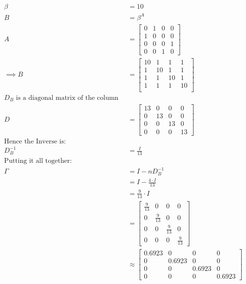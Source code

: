\documentclass[11pt]{article}
\begin{document}
\begin{align}
    \beta &= 10 \\
    B &= \beta^A \\
    A &=
    \begin{bmatrix}
0& 1& 0& 0 \\
1& 0& 0& 0 \\
0& 0& 0& 1 \\
0& 0& 1& 0
    \end{bmatrix} \\
     \implies
    B &= \begin{bmatrix}
     10 & 1 & 1 & 1 \\
     1 & 10 & 1 & 1 \\
     1 & 1 & 10 & 1 \\
     1 & 1 & 1 & 10 \\
     \end{bmatrix}  \\
     \text{$D_B$ is a diagonal matrix of the column sums:}\\
     D &= \begin{bmatrix}
     13 & 0 & 0 & 0 \\
     0 & 13 & 0 & 0 \\
     0 & 0 & 13 & 0 \\
     0 & 0 & 0 & 13
     \end{bmatrix}  \\
     \text{Hence the Inverse is:}\\
     D_B^{-1}&= \frac{I}{13}\\
     \text{Putting it all together:}\\
     \Gamma &=  I - n D^{- 1}_B \\
     &= I - \frac{4 \cdot I}{13} \\
     &= \frac{9}{13} \cdot  I \\
     &= \begin{bmatrix}
         \frac{9}{13} & 0 & 0 & 0 \\
         0 & \frac{9}{13} & 0 & 0 \\
         0 & 0 & \frac{9}{13} & 0 \\
         0 & 0 & 0 &  \frac{9}{13}
     \end{bmatrix}  \\
     & \approx \begin{bmatrix}
         0.6923 & 0 & 0 & 0 \\
         0 & 0.6923 & 0 & 0 \\
         0 & 0 & 0.6923 & 0 \\
         0 & 0 & 0 & 0.6923
     \end{bmatrix}
\end{align}
\end{document}
